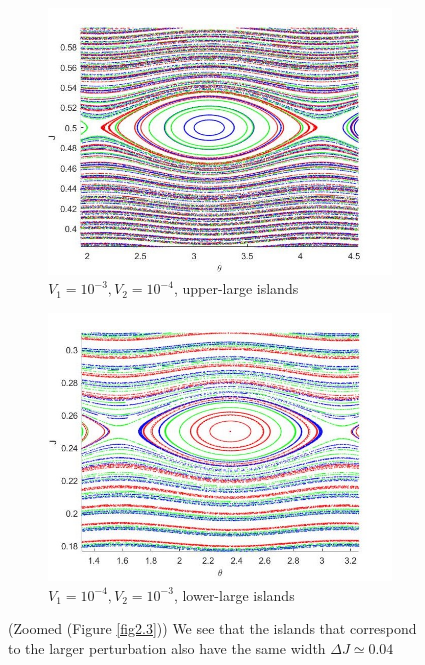 \begin{figure}[h!]
	\centering
	\begin{subfigure}{.5\textwidth}
  		\includegraphics[scale=0.5,left]{Hamiltonian_1/numerical/figs/Q5_1e-3.1e-4_3634_zoom}
  		\caption{$V_1=10^{-3},V_2=10^{-4}$, upper-large islands}
  		\label{fig2.4a}
	\end{subfigure}%
	\begin{subfigure}{.5\textwidth}
  		\includegraphics[scale=0.5,right]{Hamiltonian_1/numerical/figs/Q5_1e-4.1e-3_3634_zoom}
  		\caption{$V_1=10^{-4},V_2=10^{-3}$, lower-large islands}
  		\label{fig2.4b}
	\end{subfigure}
	\caption{(Zoomed (Figure \ref{fig2.3})) We see that the islands that correspond to the larger perturbation also have the same width $\Delta J\simeq 0.04$}
	\label{fig2.4}
\end{figure}	\newpage
